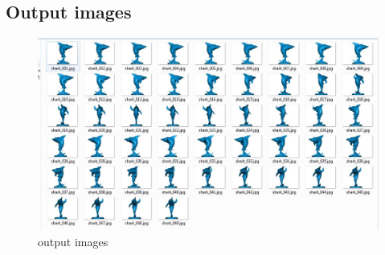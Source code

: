 \documentclass[10pt,a4paper]{article}
\begin{document}

\subsection{Output images}
\begin{figure}[h]
\centering
\includegraphics[scale=0.5]{outputImages}
\caption{output images}
\label{fig:outputImages}
\end{figure}
\end{document}
